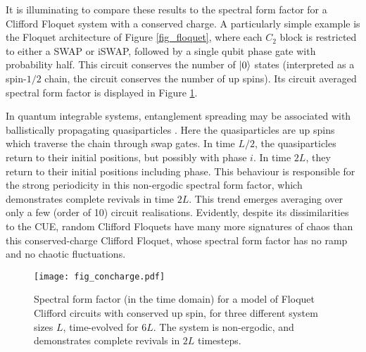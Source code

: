 \documentclass[10pt]{article}
\begin{document}





It is illuminating to compare these results to the spectral form factor for a Clifford Floquet system with a conserved charge. A particularly simple example is the Floquet architecture of Figure \ref{fig_floquet}, where each $C_2$ block is restricted to either a SWAP or iSWAP, followed by a single qubit phase gate with probability half. This circuit conserves the number of $\ket{0}$ states (interpreted as a spin-$1/2$ chain, the circuit conserves the number of up spins). Its circuit averaged spectral form factor is displayed in Figure \ref{fig_concharge}.

In quantum integrable systems, entanglement spreading may be associated with ballistically propagating quasiparticles \cite{calabrese2007quantum}. Here the quasiparticles are up spins which traverse the chain through swap gates. In time $L/2$, the quasiparticles return to their initial positions, but possibly with phase $i$. In time $2L$, they return to their initial positions including phase. This behaviour is responsible for the strong periodicity in this non-ergodic spectral form factor, which demonstrates complete revivals in time $2L$. This trend emerges averaging over only a few (order of 10) circuit realisations. Evidently, despite its dissimilarities to the CUE, random Clifford Floquets have many more signatures of chaos than this conserved-charge Clifford Floquet, whose spectral form factor has no ramp and no chaotic fluctuations.

\begin{figure}
\centering
\texttt{[image: fig\_concharge.pdf]}
\caption{Spectral form factor (in the time domain) for a model of Floquet Clifford circuits with conserved up spin, for three different system sizes $L$, time-evolved for $6L$. The system is non-ergodic, and demonstrates complete revivals in $2L$ timesteps.}
\label{fig_concharge}
\end{figure}
\end{document}
